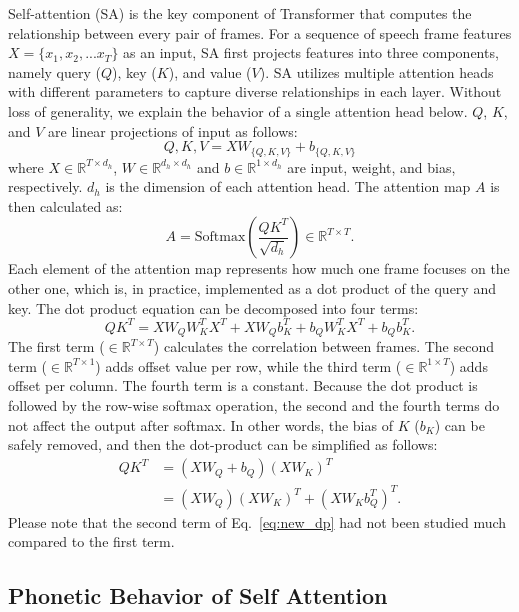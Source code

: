 Self-attention (SA) is the key component of Transformer that computes the relationship between every pair of frames.
For a sequence of speech frame features $X=\{x_1, x_2, ... x_T\}$ as an input, SA first projects features into three components, namely query ($Q$), key ($K$), and value ($V$).
SA utilizes multiple attention heads with different parameters to capture diverse relationships in each layer.
Without loss of generality, we explain the behavior of a single attention head below.
$Q$, $K$, and $V$ are linear projections of input as follows:
\begin{equation}
    Q,K,V = XW_{\{Q,K,V\}} + b_{\{Q,K,V\}}
\end{equation}
where $X\in\mathbb{R}^{T\times d_h}$, $W\in\mathbb{R}^{d_h\times d_h}$ and $b\in\mathbb{R}^{1\times d_h}$ are input, weight, and bias, respectively.
$d_h$ is the dimension of each attention head.
The attention map $A$ is then calculated as:
\begin{equation}
    A = \text{Softmax}\left( \frac{Q K^T}{\sqrt{d_h}} \right) \in \mathbb{R}^{T\times T}.
\end{equation}
Each element of the attention map represents how much one frame focuses on the other one, which is, in practice, implemented as a dot product of the query and key.
The dot product equation can be decomposed into four terms:
\begin{equation}
    QK^T = XW_Q W_K^T X^T + XW_Q b_K^T + b_Q W_K^T X^T + b_Q b_K^T.
\end{equation}
The first term ($\in \mathbb{R}^{T\times T}$) calculates the correlation between frames.
The second term ($\in \mathbb{R}^{T\times 1}$) adds offset value per row, while the third term ($\in \mathbb{R}^{1\times T}$) adds offset per column.
The fourth term is a constant.
Because the dot product is followed by the row-wise softmax operation, the second and the fourth terms do not affect the output after softmax.
In other words, the bias of $K$ ($b_K$) can be safely removed, and then the dot-product can be simplified as follows:
\begin{align}
    QK^T &= (XW_Q + b_Q)(XW_K)^T \\
         &= (XW_Q)(XW_K)^T + (XW_K b_Q^T)^T. \label{eq:new_dp}
\end{align}
Please note that the second term of Eq.~\eqref{eq:new_dp} had not been studied much compared to the first term.


\subsection{Phonetic Behavior of Self Attention}\label{ssec:phonetic}

